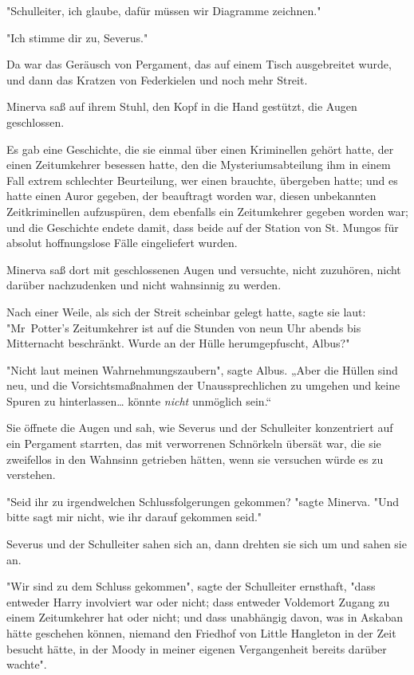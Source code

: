 {"Schulleiter, ich glaube, dafür müssen wir Diagramme zeichnen."

"Ich stimme dir zu, Severus."

Da war das Geräusch von Pergament, das auf einem Tisch ausgebreitet wurde, und dann das Kratzen von Federkielen und noch mehr Streit.

Minerva saß auf ihrem Stuhl, den Kopf in die Hand gestützt, die Augen geschlossen.

Es gab eine Geschichte, die sie einmal über einen Kriminellen gehört hatte, der einen Zeitumkehrer besessen hatte, den die Mysteriumsabteilung ihm in einem Fall extrem schlechter Beurteilung, wer einen brauchte, übergeben hatte; und es hatte einen Auror gegeben, der beauftragt worden war, diesen unbekannten Zeitkriminellen aufzuspüren, dem ebenfalls ein Zeitumkehrer gegeben worden war; und die Geschichte endete damit, dass beide auf der Station von St. Mungos für absolut hoffnungslose Fälle eingeliefert wurden.

Minerva saß dort mit geschlossenen Augen und versuchte, nicht zuzuhören, nicht darüber nachzudenken und nicht wahnsinnig zu werden.

Nach einer Weile, als sich der Streit scheinbar gelegt hatte, sagte sie laut: "Mr~Potter's Zeitumkehrer ist auf die Stunden von neun Uhr abends bis Mitternacht beschränkt. Wurde an der Hülle herumgepfuscht, Albus?"

"Nicht laut meinen Wahrnehmungszaubern", sagte Albus. „Aber die Hüllen sind neu, und die Vorsichtsmaßnahmen der Unaussprechlichen zu umgehen und keine Spuren zu hinterlassen… könnte \emph{nicht} unmöglich sein.“

Sie öffnete die Augen und sah, wie Severus und der Schulleiter konzentriert auf ein Pergament starrten, das mit verworrenen Schnörkeln übersät war, die sie zweifellos in den Wahnsinn getrieben hätten, wenn sie versuchen würde es zu verstehen.

"Seid ihr zu irgendwelchen Schlussfolgerungen gekommen? "sagte Minerva. "Und bitte sagt mir nicht, wie ihr darauf gekommen seid."

Severus und der Schulleiter sahen sich an, dann drehten sie sich um und sahen sie an.

"Wir sind zu dem Schluss gekommen", sagte der Schulleiter ernsthaft, "dass entweder Harry involviert war oder nicht; dass entweder Voldemort Zugang zu einem Zeitumkehrer hat oder nicht; und dass unabhängig davon, was in Askaban hätte geschehen können, niemand den Friedhof von Little Hangleton in der Zeit besucht hätte, in der Moody in meiner eigenen Vergangenheit bereits darüber wachte".

}
